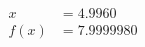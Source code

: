 \documentclass[preview]{standalone}
\begin{document}
\begin{align*}
x &= 4.9960\\f(x) &= 7.9999980
\end{align*}
\end{document}
